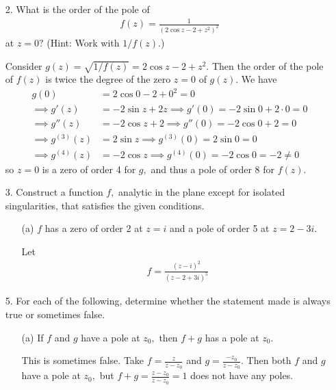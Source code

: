 \documentclass{article}
\begin{document}
\begin{itemize}
	\item[2.] What is the order of the pole of 
		\begin{align*}
			f(z)= \frac{1}{(2\cos z-2+z^2)^2}
		\end{align*}
		at $z=0?$ (Hint: Work with $1/f(z).$)
		\begin{soln}
			Consider $g(z)=\sqrt{1/f(z)}=2\cos z-2+z^2.$ Then the order of the pole of $f(z)$ is twice the degree of the zero $z=0$ of $g(z).$ We have
			\begin{align*}
				g(0) &= 2\cos 0-2+0^2 = 0 \\
				\implies g'(z) &= -2\sin z + 2z \implies g'(0) = -2\sin 0 + 2\cdot 0 = 0 \\
				\implies g''(z) &= -2\cos z + 2 \implies g''(0) = -2\cos 0 + 2 = 0\\
				\implies g^{(3)}(z) &= 2\sin z \implies g^{(3)}(0) = 2\sin 0 = 0 \\
				\implies g^{(4)}(z) &= -2\cos z \implies g^{(4)}(0) = -2\cos 0 = -2\neq 0
			\end{align*}
			so $z=0$ is a zero of order 4 for $g,$ and thus a pole of order 8 for $f(z).$
		\end{soln}

	\item[3.] Construct a function $f,$ analytic in the plane except for isolated singularities, that satisfies the given conditions.
		\begin{itemize}
			\item[(a)] $f$ has a zero of order 2 at $z=i$ and a pole of order 5 at $z=2-3i.$
				\begin{soln}
					Let
					\begin{align*}
						f = \frac{(z-i)^2}{(z-2+3i)^5}
					\end{align*}
				\end{soln}
		
		\end{itemize}

	\item[5.] For each of the following, determine whether the statement made is always true or sometimes false.
		\begin{itemize}
			\item[(a)] If $f$ and $g$ have a pole at $z_0,$ then $f+g$ has a pole at $z_0.$
				\begin{answer*}
					This is sometimes false. Take $f=\frac{z}{z-z_0}$ and $g=\frac{-z_0}{z-z_0}.$ Then both $f$ and $g$ have a pole at $z_0,$ but $f+g=\frac{z-z_0}{z-z_0}=1$ does not have any poles.
				\end{answer*}


\end{itemize}
\end{itemize}
\end{document}
